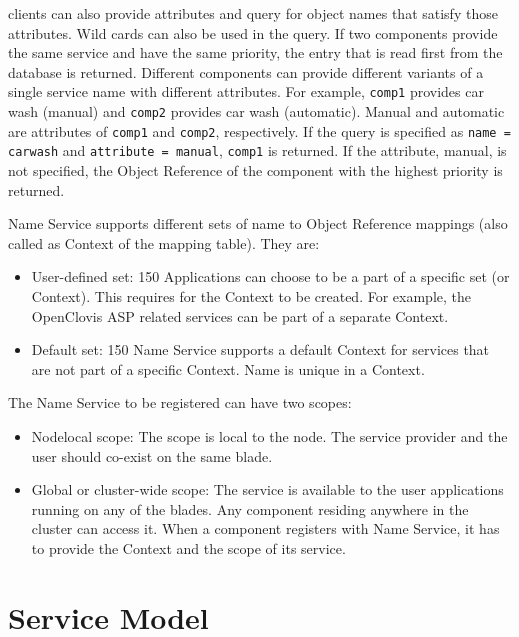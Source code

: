 \begin{flushleft}
clients can also provide attributes and query for object names that satisfy those attributes. Wild cards can also be used in the query. If two components
provide the same service and have the same priority, the entry that is read first from the database is returned. Different components can provide
different variants of a single service name with different attributes. For example, {\tt{comp1}} provides car wash (manual) and {\tt{comp2}} provides
car wash (automatic). Manual and automatic are attributes of {\tt{comp1}} and {\tt{comp2}}, respectively. If the query is specified as {\tt{name = carwash}}
and {\tt{attribute = manual}}, {\tt{comp1}} is returned. If the attribute, manual, is not specified, the Object Reference of the component with the highest priority is returned.
\par
Name Service supports different sets of name to Object Reference mappings (also called as Context of the mapping table). 
They are:\begin{itemize}
\item
User-defined set: 150 Applications can choose to be a part of a specific set (or Context). This requires for the Context to be created. For example, the 
OpenClovis ASP related services can be part of a separate Context. 
\item
Default set: 150 Name Service supports a default Context for services that are not part of a specific Context. Name is unique in a Context.
\end{itemize}

The Name Service to be registered can have two scopes:
\begin{itemize}
\item
Nodelocal scope: The scope is local to the node. The service provider and the user should co-exist on the same blade. 
\item
Global or cluster-wide scope: The service is available to the user applications running on any of the blades. Any component residing anywhere in the cluster can access 
it. When a component registers with Name Service, it has to provide the Context and the scope of its service.
\end{itemize}


\chapter{Service Model}

\end{flushleft}
